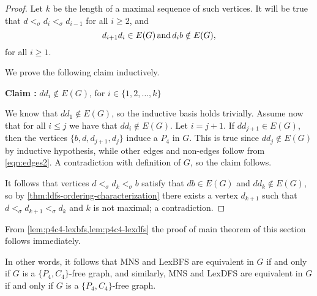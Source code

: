\documentclass{svproc}
\begin{document}
\begin{proof}
Let $k$ be the length of a maximal sequence of such vertices. It will be true that $d<_\sigma d_i<_\sigma d_{i-1}$ for all $i\ge 2$, and 
\begin{equation}
\label{eqn:edges2}
d_{i+1}d_i\in E(G)\, {\rm and }\, d_ib\notin E(G),
\end{equation} for all $i\ge 1$. 


We prove the following claim inductively. 

\noindent\textbf{Claim :} $dd_i\notin E(G)$, for $i\in \{1,2, \dots, k\}$

We know that $dd_1\notin E(G)$, so the inductive basis holds trivially. Assume now that for all $i\le j$ we have that $dd_{i}\notin E(G)$. Let $i=j+1$. If $dd_{j+1}\in E(G)$, then the vertices $\{b,d,d_{j+1},d_j\}$ induce a $P_4$ in $G$. This is true since $dd_{j}\notin E(G)$ by inductive hypothesis, while other edges and non-edges follow from \ref{eqn:edges2}. A contradiction with definition of $G$, so the claim follows.
 
It follows that vertices $d<_\sigma d_k<_\sigma b$ satisfy that $db\in E(G)$ and $dd_k\notin E(G)$, so by \cref{thm:ldfs-ordering-characterization} there exists a vertex $d_{k+1}$ such that $d<_\sigma d_{k+1}<_\sigma d_k$ and $k$ is not maximal; a contradiction. 
\end{proof}



From \cref{lem:p4c4-lexbfs,lem:p4c4-lexdfs} the proof of main theorem of this section follows  immediately. 
\thmMNSldfsLBFS*

In other words, it follows that MNS and LexBFS are equivalent in $G$ if and only if $G$ is a $\{P_4,C_4\}$-free graph, and similarly, MNS and LexDFS are equivalent in $G$ if and only if $G$ is a $\{P_4,C_4\}$-free graph.



\fi
\end{document}
